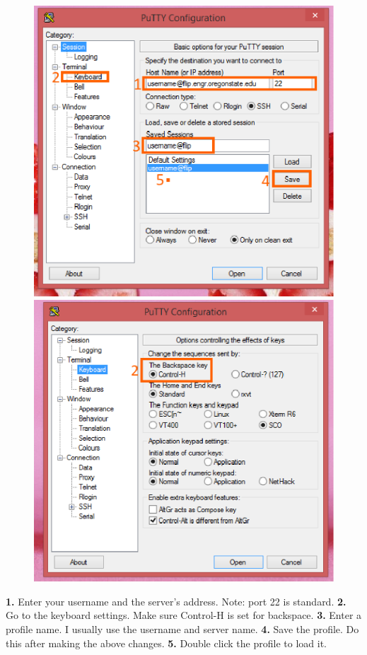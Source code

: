 \documentclass[letterpaper,10pt,titlepage,fleqn]{article}
\begin{document}
\begin{figure}[ht!]
  \includegraphics[scale=0.5]{images/putty1.eps}
  \includegraphics[scale=0.5]{images/putty2.eps}
\end{figure}

\textbf{1.} Enter your username and the server's address. Note: port 22 is standard.
\textbf{2.} Go to the keyboard settings. Make sure Control-H is set for backspace.
\textbf{3.} Enter a profile name. I usually use the username and server name.
\textbf{4.} Save the profile. Do this after making the above changes.
\textbf{5.} Double click the profile to load it. 
\end{document}
